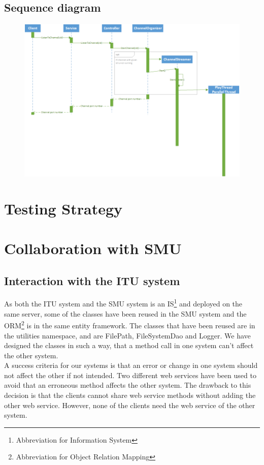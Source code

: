 \documentclass[a4paper,11pt,report]{article}
\begin{document}
\begin{landscape}
\subsection{Sequence diagram}
\begin{figure}[H]
\includegraphics[]{./ListenToChannelSD.png}
\end{figure}
\end{landscape}

\section{Testing Strategy}

\section{Collaboration with SMU}

\subsection{Interaction with the ITU system}
As both the ITU system and the SMU system is an IS\footnote[2]{Abbreviation for Information System} and deployed on the same server, some of the classes have been reused in the SMU system and the ORM\footnote[3]{Abbreviation for Object Relation Mapping} is in the same entity framework.
The classes that have been reused are in the utilities namespace, and are FilePath, FileSystemDao and Logger. We have designed the classes in such a way, that a method call in one system can't affect the other system. \\
A success criteria for our systems is that an error or change in one system should not affect the other if not intended. Two different web services have been used to avoid that an erroneous method affects the other system.
The drawback to this decision is that the clients cannot share web service methods without adding the other web service. However, none of the clients need the web service of the other system. 
\end{document}
